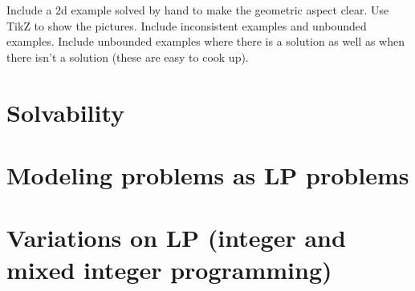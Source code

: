 \documentclass[12pt,english]{article}
\begin{document}
Include a 2d example solved by hand to make the geometric aspect clear.  Use TikZ to show the pictures.   Include inconsistent examples and unbounded examples.  Include unbounded examples where there is a solution as well as when there isn't a solution (these are easy to cook up).

\section{Solvability}

\section{Modeling problems as LP problems}

\section{Variations on LP (integer and mixed integer programming)}

{}

\end{document}
